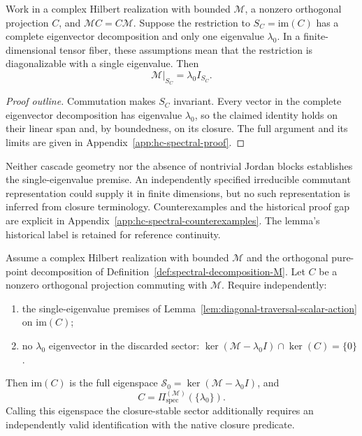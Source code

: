 \begin{lemma}
\label{lem:diagonal-traversal-scalar-action}
Work in a complex Hilbert realization with bounded $\mathcal M$, a
nonzero orthogonal projection $C$, and $\mathcal MC=C\mathcal M$.
Suppose the restriction to $S_C=\mathrm{im}(C)$ has a complete
eigenvector decomposition and only one eigenvalue $\lambda_0$.
In a finite-dimensional tensor fiber, these assumptions mean that
the restriction is diagonalizable with a single eigenvalue. Then
\[
  \mathcal M\big|_{S_C}=\lambda_0 I_{S_C}.
\]
\end{lemma}

\begin{proof}[Proof outline]
Commutation makes $S_C$ invariant. Every vector in the complete
eigenvector decomposition has eigenvalue $\lambda_0$, so the claimed
identity holds on their linear span and, by boundedness, on its closure.
The full argument and its limits are given in
Appendix~\ref{app:hc-spectral-proof}.
\end{proof}

\begin{remark}
\label{rem:scalar-action-proof-obligation}
Neither cascade geometry nor the absence of nontrivial Jordan blocks
establishes the single-eigenvalue premise. An independently specified
irreducible commutant representation could supply it in finite dimensions,
but no such representation is inferred from closure terminology.
Counterexamples and the historical proof gap are explicit in
Appendix~\ref{app:hc-spectral-counterexamples}. The lemma's historical
label is retained for reference continuity.
\end{remark}

\begin{theorem}
\label{thm:hc-spectral-projector}
Assume a complex Hilbert realization with bounded $\mathcal M$ and
the orthogonal pure-point decomposition of
Definition~\ref{def:spectral-decomposition-M}. Let $C$ be a nonzero
orthogonal projection commuting with $\mathcal M$. Require independently:
\begin{enumerate}[label=(\roman*)]
 \item the single-eigenvalue premises of
 Lemma~\ref{lem:diagonal-traversal-scalar-action} on $\mathrm{im}(C)$;
 \item no $\lambda_0$ eigenvector in the discarded sector:
 $\ker(\mathcal M-\lambda_0 I)\cap\ker(C)=\{0\}$.
\end{enumerate}
Then $\mathrm{im}(C)$ is the full eigenspace
$\mathcal S_0=\ker(\mathcal M-\lambda_0 I)$, and
\[
 C=\Pi^{(\mathcal M)}_{\mathrm{spec}}(\{\lambda_0\}).
\]
Calling this eigenspace the closure-stable sector additionally requires
an independently valid identification with the native closure predicate.
\end{theorem}

